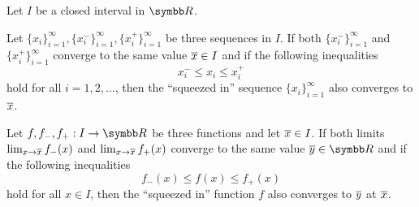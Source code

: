 \begin{lemma}\label{thm:squeeze_lemma}
  Let \( I \) be a closed interval in \( \R \).

  \begin{thmenum}
     Let \( \{ x_i \}_{i=1}^\infty, \{ x_i^- \}_{i=1}^\infty, \{ x_i^+ \}_{i=1}^\infty \) be three sequences in \( I \). If both \( \{ x_i^- \}_{i=1}^\infty \) and \( \{ x_i^+ \}_{i=1}^\infty \) converge to the same value \( \overline{x} \in I \) and if the following inequalities
    \begin{equation*}
      x_i^- \leq x_i \leq x_i^+
    \end{equation*}
    hold for all \( i = 1, 2, \ldots \), then the \enquote{squeezed in} sequence \( \{ x_i \}_{i=1}^\infty \) also converges to \( \overline{x} \).

     Let \( f, f_-, f_+: I \to \R \) be three functions and let \( \overline{x} \in I \). If both limits \( \lim_{x \to \overline{x}} f_-(x) \) and \( \lim_{x \to \overline{x}} f_+(x) \) converge to the same value \( \Ol y \in \R \) and if the following inequalities
    \begin{equation*}
      f_-(x) \leq f(x) \leq f_+(x)
    \end{equation*}
    hold for all \( x \in I \), then the \enquote{squeezed in} function \( f \) also converges to \( \overline{y} \) at \( \overline{x} \).
  \end{thmenum}
\end{lemma}
